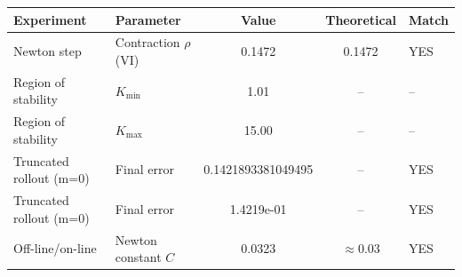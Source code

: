 \begin{tabular}{llccl}
\toprule
Experiment & Parameter & Value & Theoretical & Match \\
\midrule
Newton step & Contraction $\rho$ (VI) & 0.1472 & 0.1472 & YES \\
Region of stability & $K_{\min}$ & 1.01 & -- & -- \\
Region of stability & $K_{\max}$ & 15.00 & -- & -- \\
Truncated rollout (m=0) & Final error & 0.1421893381049495 & -- & YES \\
Truncated rollout (m=0) & Final error & 1.4219e-01 & -- & YES \\
Off-line/on-line & Newton constant $C$ & 0.0323 & $\approx 0.03$ & YES \\
\bottomrule
\end{tabular}